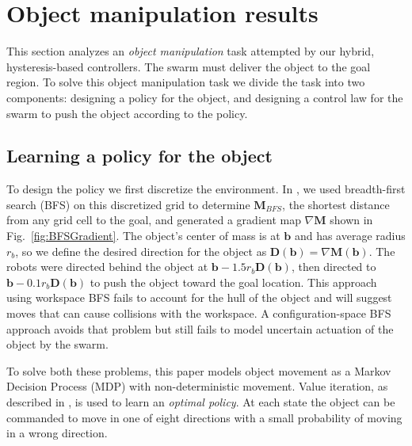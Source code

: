
\section{Object manipulation results}\label{sec:exp}

This section analyzes an \emph{object manipulation} task attempted by our hybrid, hysteresis-based controllers.%
 The swarm must deliver the object to the goal region.  To solve this object manipulation task we divide the task into two components: designing a policy for the object, and designing a control law for the swarm to push the object according to the policy.

\subsection{Learning a policy for the object}\label{subsec:objectpolicy}

To design the policy we first discretize the environment. 
In \cite{ShahrokhiIROS2015}, we used breadth-first search (BFS) on this discretized grid to determine $\mathbf{M}_{BFS}$, the shortest distance from any grid cell to the goal, and generated a gradient map $\nabla \mathbf{M}$  shown in Fig.~\ref{fig:BFSGradient}.  
The object's center of mass is at $\mathbf{b}$ and has average radius $r_b$, so we define the desired direction for the object as $\mathbf{D}(\mathbf{b}) = \nabla \mathbf{M}(\mathbf{b})$. 
The robots were directed behind the object at  $\mathbf{b} - 1.5 r_b \mathbf{D}(\mathbf{b})$, then directed to  $\mathbf{b} - 0.1 r_b \mathbf{D}(\mathbf{b})$ to push the object toward the goal location. 
This approach using workspace BFS fails to account for the hull of the object and will suggest moves that can cause collisions with the workspace. A configuration-space BFS approach avoids that problem but still fails to model uncertain actuation of the object by the swarm.

To solve both these problems, this paper models object movement as a Markov Decision Process (MDP) with non-deterministic movement.  
  Value iteration,  as described in \cite{Thrun2005}, is used to learn an \emph{optimal policy}.
   At each state the object can be commanded to move in one of eight directions with a small probability of moving in a wrong direction. 
 

